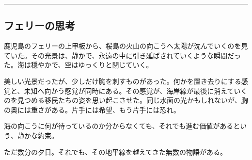 \documentclass[
  letterpaper,
  oneside]{scrbook}
\begin{document}
\begin{center}\rule{0.5\linewidth}{0.5pt}\end{center}

\subsection{フェリーの思考}\label{ux30d5ux30a7ux30eaux30fcux306eux601dux8003}

鹿児島のフェリーの上甲板から、桜島の火山の向こうへ太陽が沈んでいくのを見ていた。その光景は、静かで、永遠の中に引き延ばされていくような瞬間だった。海は穏やかで、空はゆっくりと閉じていく。

美しい光景だったが、少しだけ胸を刺すものがあった。何かを置き去りにする感覚と、未知へ向かう感覚が同時にある。その感覚が、海岸線が最後に消えていくのを見つめる移民たちの姿を思い起こさせた。同じ水面の光かもしれないが、胸の奥には重さがある。片手には希望、もう片手には恐れ。

海の向こうに何が待っているのか分からなくても、それでも進む価値があるという、静かな約束。

ただ数分の夕日。それでも、その地平線を越えてきた無数の物語がある。


\backmatter
\end{document}
